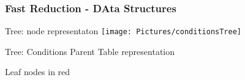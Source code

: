 \documentclass{beamer}
\begin{document}
\begin{frame}[fragile=singleslide]
\frametitle{Fast Reduction - DAta Structures}


\begin{minipage}[t]{0.48\linewidth}
\begin{block}{Tree: node representaton}
\texttt{[image: Pictures/conditionsTree]}
\end{block}
%
%
\end{minipage}\hfill
\begin{minipage}[t]{0.48\linewidth}
\begin{block}{Tree: Conditions Parent Table representation}
\begin{center}
\begin{tiny}

Leaf nodes in \alert{red}


\end{tiny}
\end{center}
\end{block}
\end{minipage}
\end{frame}
\end{document}
